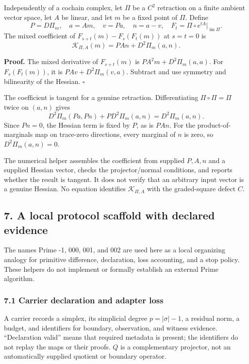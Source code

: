 \documentclass[
  11pt,
]{article}
\begin{document}
Independently of a cochain complex, let \(\Pi\) be a \(C^2\) retraction on a
finite ambient vector space, let \(A\) be linear, and let \(m\) be a fixed
point of \(\Pi\). Define
\[
P=D\Pi_m,\quad a=Am,\quad v=Pa,\quad n=a-v,\quad
F_t=\Pi\circ e^{tA}|_{\operatorname{im}\Pi}.
\]
The mixed coefficient of
\(F_{s+t}(m)-F_s(F_t(m))\) at \(s=t=0\) is
\[
\mathcal K_{\Pi,A}(m)=PAn+D^2\Pi_m(a,n).
\]

\textbf{Proof.} The mixed derivative of \(F_{s+t}(m)\) is
\(PA^2m+D^2\Pi_m(a,a)\). For \(F_s(F_t(m))\), it is
\(PAv+D^2\Pi_m(v,a)\). Subtract and use symmetry and bilinearity of
the Hessian. \(\square\)

The coefficient is tangent for a genuine retraction.
Differentiating \(\Pi\circ\Pi=\Pi\) twice on \((a,n)\) gives
\[
D^2\Pi_m(Pa,Pn)+P D^2\Pi_m(a,n)=D^2\Pi_m(a,n).
\]
Since \(Pn=0\), the Hessian term is fixed by \(P\), as is \(PAn\).
For the product-of-marginals map on trace-zero directions, every marginal
of \(n\) is zero, so \(D^2\Pi_m(a,n)=0\).

The numerical helper assembles the coefficient from supplied \(P,A,n\) and
a supplied Hessian vector, checks the projector/normal conditions, and
reports whether the result is tangent. It does not verify that an arbitrary
input vector is a genuine Hessian. No equation identifies
\(\mathcal K_{\Pi,A}\) with the graded-square defect \(C\).

\subsection{7. A local protocol scaffold with declared evidence}\label{a-local-protocol-scaffold-with-declared-evidence}

The names Prime -1, 000, 001, and 002 are used here as a local organizing
analogy for primitive difference, declaration, loss accounting, and a stop
policy. These helpers do not implement or formally establish an external
Prime algorithm.

\subsubsection{7.1 Carrier declaration and adapter loss}\label{carrier-declaration-and-adapter-loss}

A carrier records a simplex, its simplicial degree \(p=|\sigma|-1\), a
residual norm, a budget, and identifiers for boundary, observation, and
witness evidence. ``Declaration valid'' means that required metadata is
present; the identifiers do not replay the maps or their proofs.
\(Q\) is a complementary projector, not an automatically supplied quotient
or boundary operator.
\end{document}
